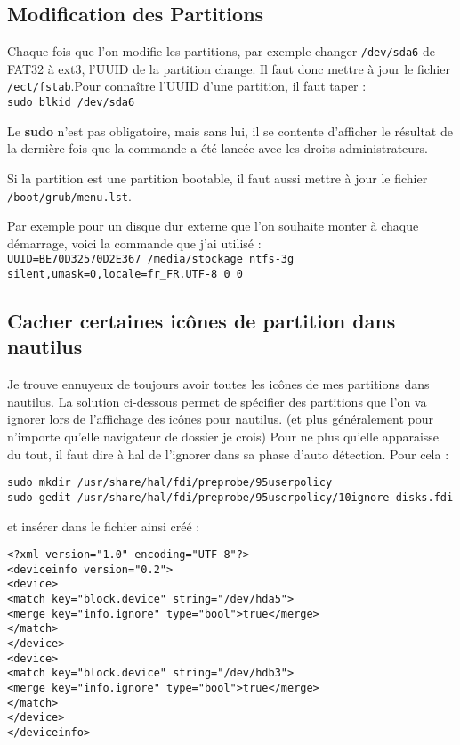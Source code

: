 \documentclass[a4paper,twoside]{article}
\begin{document}
\subsection{Modification des Partitions}
Chaque fois que l'on modifie les partitions, par exemple changer \verb|/dev/sda6| de FAT32 à ext3, l'UUID de la partition change. Il faut donc mettre à jour le fichier \verb|/ect/fstab|.Pour connaître l'UUID d'une partition, il faut taper :\\
\verb|sudo blkid /dev/sda6|

\begin{remarque}
Le \textbf{sudo} n'est pas obligatoire, mais sans lui, il se contente d'afficher le résultat de la dernière fois que la commande a été lancée avec les droits administrateurs.
\end{remarque}

Si la partition est une partition bootable, il faut aussi mettre à jour le fichier \verb|/boot/grub/menu.lst|.

Par exemple pour un disque dur externe que l'on souhaite monter à chaque démarrage, voici la commande que j'ai utilisé :\\
\verb|UUID=BE70D32570D2E367 /media/stockage ntfs-3g silent,umask=0,locale=fr_FR.UTF-8 0 0|

\subsection{Cacher certaines icônes de partition dans nautilus}
Je trouve ennuyeux de toujours avoir toutes les icônes de mes partitions dans nautilus. La solution ci-dessous permet de spécifier des partitions que l'on va ignorer lors de l'affichage des icônes pour nautilus. (et plus généralement pour n'importe qu'elle navigateur de dossier je crois) Pour ne plus qu'elle apparaisse du tout, il faut dire à hal de l'ignorer dans sa phase d'auto détection. Pour cela :


\begin{verbatim}
sudo mkdir /usr/share/hal/fdi/preprobe/95userpolicy
sudo gedit /usr/share/hal/fdi/preprobe/95userpolicy/10ignore-disks.fdi
\end{verbatim}

et insérer dans le fichier ainsi créé :

\begin{verbatim}
<?xml version="1.0" encoding="UTF-8"?>
<deviceinfo version="0.2">
<device>
<match key="block.device" string="/dev/hda5">
<merge key="info.ignore" type="bool">true</merge>
</match>
</device>
<device>
<match key="block.device" string="/dev/hdb3">
<merge key="info.ignore" type="bool">true</merge>
</match>
</device>
</deviceinfo>
\end{verbatim}
\end{document}
